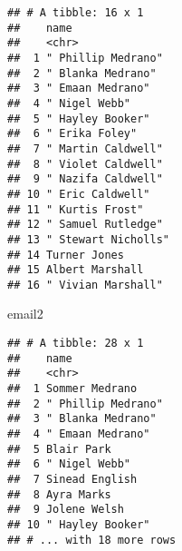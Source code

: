 \documentclass[]{article}
\newenvironment{Shaded}{\begin{snugshade}}{\end{snugshade}}
\newcommand{\KeywordTok}[1]{\textcolor[rgb]{0.13,0.29,0.53}{\textbf{#1}}}
\newcommand{\DataTypeTok}[1]{\textcolor[rgb]{0.13,0.29,0.53}{#1}}
\newcommand{\StringTok}[1]{\textcolor[rgb]{0.31,0.60,0.02}{#1}}
\newcommand{\CommentTok}[1]{\textcolor[rgb]{0.56,0.35,0.01}{\textit{#1}}}
\newcommand{\OperatorTok}[1]{\textcolor[rgb]{0.81,0.36,0.00}{\textbf{#1}}}
\newcommand{\NormalTok}[1]{#1}
\begin{document}
\begin{Shaded}
\end{Shaded}

\begin{verbatim}
## # A tibble: 16 x 1
##    name               
##    <chr>              
##  1 " Phillip Medrano" 
##  2 " Blanka Medrano"  
##  3 " Emaan Medrano"   
##  4 " Nigel Webb"      
##  5 " Hayley Booker"   
##  6 " Erika Foley"     
##  7 " Martin Caldwell" 
##  8 " Violet Caldwell" 
##  9 " Nazifa Caldwell" 
## 10 " Eric Caldwell"   
## 11 " Kurtis Frost"    
## 12 " Samuel Rutledge" 
## 13 " Stewart Nicholls"
## 14 Turner Jones       
## 15 Albert Marshall    
## 16 " Vivian Marshall"
\end{verbatim}

\begin{Shaded}
\begin{Highlighting}[]
\NormalTok{email2}
\end{Highlighting}
\end{Shaded}

\begin{verbatim}
## # A tibble: 28 x 1
##    name              
##    <chr>             
##  1 Sommer Medrano    
##  2 " Phillip Medrano"
##  3 " Blanka Medrano" 
##  4 " Emaan Medrano"  
##  5 Blair Park        
##  6 " Nigel Webb"     
##  7 Sinead English    
##  8 Ayra Marks        
##  9 Jolene Welsh      
## 10 " Hayley Booker"  
## # ... with 18 more rows
\end{verbatim}
\end{document}
